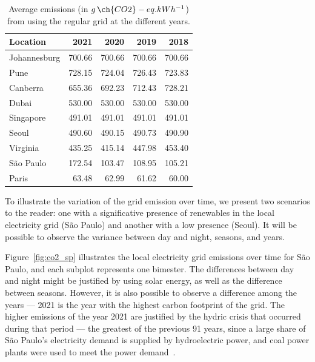 \begin{table}[h]
  \caption{Average emissions (in $g\,\ch{CO2}-eq.kWh^{-1}$) from using the regular grid at the different years.}\label{tab:grid_emissions_avg_year} \centering
  \begin{tabular}{|l|r|r|r|r|}    
  \hline   
  \textbf{Location} &  \textbf{2021} & \textbf{2020} & \textbf{2019} & \textbf{2018}\\
  \hline
  Johannesburg & 700.66 & 700.66 & 700.66 & 700.66  \\
  \hline
  Pune & 728.15 & 724.04 & 726.43 & 723.83     \\
  \hline
  Canberra & 655.36 & 692.23 & 712.43 & 728.21\\
  \hline
  Dubai & 530.00  & 530.00 & 530.00 & 530.00     \\
  \hline
  Singapore & 491.01 & 491.01 & 491.01 & 491.01 \\
  \hline     
  Seoul & 490.60 & 490.15 & 490.73 & 490.90     \\
  \hline
  Virginia  & 435.25 & 415.14 & 447.98 & 453.40 \\
  \hline
  São Paulo &  172.54 &  103.47 & 108.95 &  105.21 \\
  \hline 
  Paris &  63.48  & 62.99 & 61.62   & 60.00   \\
  \hline

\end{tabular}  
\end{table}


To illustrate the variation of the grid emission over time, we present two scenarios to the reader: one with a significative presence of renewables in the local electricity grid (São Paulo) and another with a low presence (Seoul). It will be possible to observe the variance between day and night, seasons, and years.


Figure~\ref{fig:co2_sp} illustrates the local electricity grid emissions over time for São Paulo, and each subplot represents one bimester. The differences between day and night might be justified by using solar energy, as well as the difference between seasons. However, it is also possible to observe a difference among the years --- 2021 is the year with the highest carbon footprint of the grid. The higher emissions of the year 2021 are justified by the hydric crisis that occurred during that period --- the greatest of the previous 91 years, since a large share of São Paulo's electricity demand is supplied by hydroelectric power, and coal power plants were used to meet the power demand~\cite{CNN2021_crisehidrica}. %

